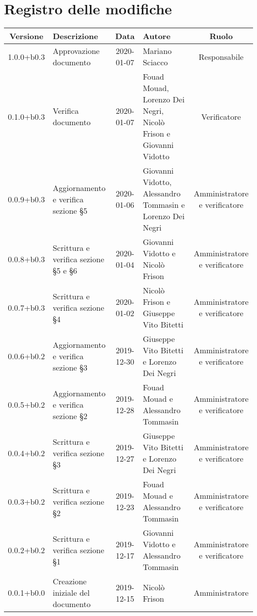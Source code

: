 \section*{Registro delle modifiche}

\begin{center}
	\begin{longtable}{|c|p{3cm}|c|p{4cm}|c|}
	\hline
	\rowcolor{lighter-grayer}
	\textbf{Versione} & \textbf{Descrizione} & \textbf{Data} & \textbf{Autore} & \textbf{Ruolo} \\
	\hline
	\endfirsthead

	1.0.0+b0.3 & Approvazione documento & 2020-01-07 & Mariano Sciacco & Responsabile \\
	\hline
	0.1.0+b0.3 & Verifica documento & 2020-01-07 & Fouad Mouad, Lorenzo Dei Negri, Nicolò Frison e Giovanni Vidotto & Verificatore \\
	\hline
	0.0.9+b0.3 & Aggiornamento e verifica sezione \S5 & 2020-01-06 & Giovanni Vidotto, Alessandro Tommasin e Lorenzo Dei Negri & Amministratore e verificatore \\
	\hline
	0.0.8+b0.3 & Scrittura e verifica sezione \S5 e \S6 & 2020-01-04 & Giovanni Vidotto e Nicolò Frison & Amministratore e verificatore \\
	\hline
	0.0.7+b0.3 &  Scrittura e verifica sezione \S4 & 2020-01-02 & Nicolò Frison e Giuseppe Vito Bitetti & Amministratore e verificatore \\
	\hline
	0.0.6+b0.2 & Aggiornamento e verifica sezione \S3  & 2019-12-30 & Giuseppe Vito Bitetti e Lorenzo Dei Negri & Amministratore e verificatore \\
	\hline
	0.0.5+b0.2 & Aggiornamento e verifica sezione \S2  & 2019-12-28 & Fouad Mouad e Alessandro Tommasin & Amministratore e verificatore \\
	\hline
	0.0.4+b0.2 & Scrittura e verifica sezione \S3 & 2019-12-27  & Giuseppe Vito Bitetti e Lorenzo Dei Negri & Amministratore e verificatore \\
	\hline
	0.0.3+b0.2 & Scrittura e verifica sezione \S2 & 2019-12-23 & Fouad Mouad e Alessandro Tommasin & Amministratore e verificatore \\
	\hline
	0.0.2+b0.2 & Scrittura e verifica sezione \S1 & 2019-12-17 & Giovanni Vidotto e Alessandro Tommasin & Amministratore e verificatore \\
	\hline
	0.0.1+b0.0 & Creazione iniziale del documento & 2019-12-15 & Nicolò Frison & Amministratore \\
	\hline

	\end{longtable}
\end{center}